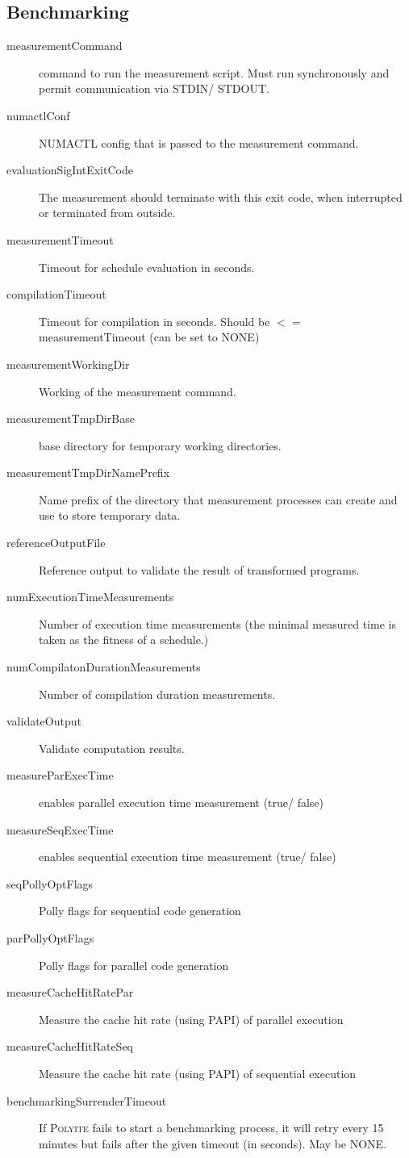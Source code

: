 \documentclass{article}
\begin{document}
\subsection{Benchmarking}
\begin{description}
  \item[measurementCommand] command to run the measurement script. Must run
    synchronously and permit communication via STDIN/ STDOUT.
  \item[numactlConf] \textsc{NUMACTL} config that is passed to the measurement
    command.
  \item[evaluationSigIntExitCode] The measurement should terminate with this
    exit code, when interrupted or terminated from outside.
  \item[measurementTimeout] Timeout for schedule evaluation in seconds.
  \item[compilationTimeout] Timeout for compilation in seconds. Should be $<=$
    measurementTimeout (can be set to NONE)
  \item[measurementWorkingDir] Working of the measurement command.
  \item[measurementTmpDirBase] base directory for temporary working directories.
  \item[measurementTmpDirNamePrefix] Name prefix of the directory that
    measurement processes can create and use to store temporary data.
  \item[referenceOutputFile] Reference output to validate the result of
    transformed programs.
  \item[numExecutionTimeMeasurements] Number of execution time measurements
    (the minimal measured time is taken as the fitness of a schedule.)
  \item[numCompilatonDurationMeasurements] Number of compilation duration
    measurements.
  \item[validateOutput] Validate computation results.
  \item[measureParExecTime] enables parallel execution time measurement (true/
    false)
  \item[measureSeqExecTime] enables sequential execution time measurement
    (true/ false)
  \item[seqPollyOptFlags] Polly flags for sequential code generation
  \item[parPollyOptFlags] Polly flags for parallel code generation
  \item[measureCacheHitRatePar] Measure the cache hit rate (using PAPI) of
    parallel execution
  \item[measureCacheHitRateSeq] Measure the cache hit rate (using PAPI) of
    sequential execution
  \item[benchmarkingSurrenderTimeout] If \textsc{Polyite} fails to start a
    benchmarking process, it will retry every 15 minutes but fails after the
    given timeout (in seconds). May be NONE.
\end{description}
\end{document}
